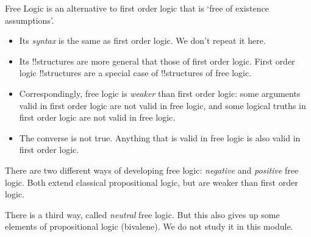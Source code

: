 \documentclass[../../../../include/open-logic-section]{subfiles}
\begin{document}


Free Logic is an alternative to first order logic that is `free of
existence assumptions'. 

\begin{itemize}
\item Its \emph{syntax} is the same as first order logic. We don't
repeat it here.
\item Its !!{structure}s are more general that those of first order logic. 
First order logic !!{structure}s are a special case of !!{structure}s
of free logic. 
\item Correspondingly, free logic is \emph{weaker} than first order 
logic: some arguments valid in first order logic are not valid in 
free logic, and some logical truths in first order logic are not valid
in free logic.
\item The converse is not true. Anything that is valid in free logic 
is also valid in first order logic. 
\end{itemize}

There are two different ways of developing free logic: \emph{negative}
and \emph{positive} free logic. Both extend classical propositional 
logic, but are weaker than first order logic. 

There is a third way, called \emph{neutral} free logic. But this also
gives up some elements of propositional logic (bivalene). We do not 
study it in this module. 
\end{document}
